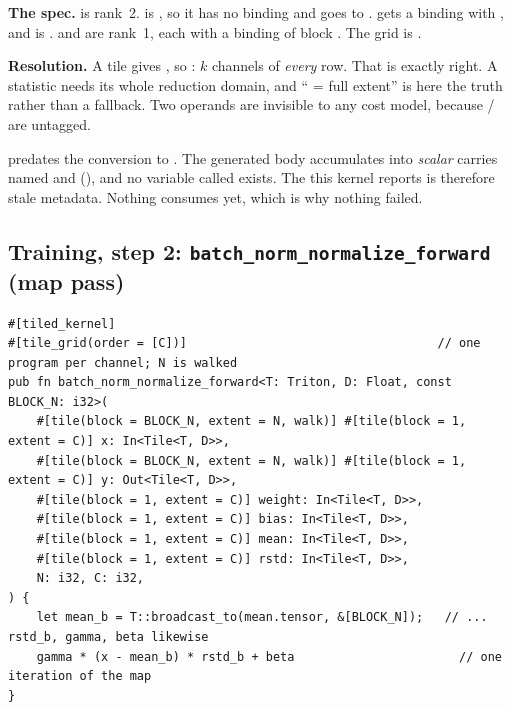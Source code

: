 \textbf{The spec.}  is rank~2.  is , so it has no binding
and goes to .  gets a binding with
, and  is .  and
 are rank~1, each with a  binding of block . The grid is
\code{[C]}.

\textbf{Resolution.} A  tile \code{[k]} gives ,
so : $k$ channels of \emph{every} row. That is exactly right. A
statistic needs its whole reduction domain, and `` = full extent'' is here
the truth rather than a fallback. Two operands are invisible to any cost model,
because / are untagged.

\begin{note}
\code{#[tile_carry(acc_sum = [BLOCK_N], acc_sum_sq = [BLOCK_N])]} predates the
conversion to . The generated body accumulates into
\emph{scalar} carries named  and  (), and no
variable called  exists. The  this kernel reports is
therefore stale metadata. Nothing consumes  yet, which is why
nothing failed.
\end{note}

\subsection{Training, step 2: \texttt{batch\_norm\_normalize\_forward} (map pass)}

\begin{lstlisting}
#[tiled_kernel]
#[tile_grid(order = [C])]                                   // one program per channel; N is walked
pub fn batch_norm_normalize_forward<T: Triton, D: Float, const BLOCK_N: i32>(
    #[tile(block = BLOCK_N, extent = N, walk)] #[tile(block = 1, extent = C)] x: In<Tile<T, D>>,
    #[tile(block = BLOCK_N, extent = N, walk)] #[tile(block = 1, extent = C)] y: Out<Tile<T, D>>,
    #[tile(block = 1, extent = C)] weight: In<Tile<T, D>>,
    #[tile(block = 1, extent = C)] bias: In<Tile<T, D>>,
    #[tile(block = 1, extent = C)] mean: In<Tile<T, D>>,
    #[tile(block = 1, extent = C)] rstd: In<Tile<T, D>>,
    N: i32, C: i32,
) {
    let mean_b = T::broadcast_to(mean.tensor, &[BLOCK_N]);   // ... rstd_b, gamma, beta likewise
    gamma * (x - mean_b) * rstd_b + beta                       // one iteration of the map
}
\end{lstlisting}

